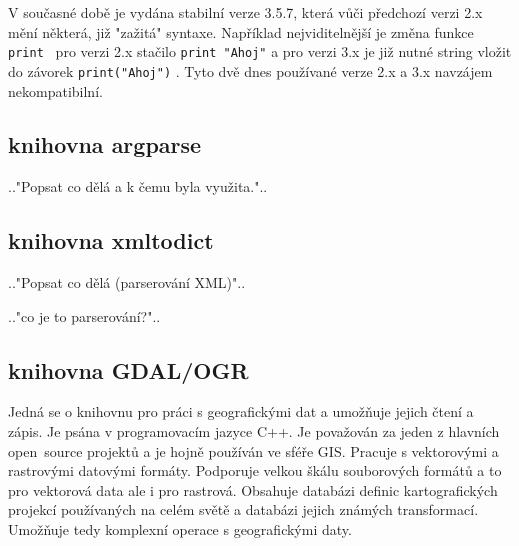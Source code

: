 V současné době je vydána stabilní verze 3.5.7, která vůči předchozí verzi 2.x
mění některá, již "zažitá" syntaxe. Například nejviditelnější je změna funkce 
{\tt print } pro verzi 2.x stačilo  {\tt print "Ahoj"}  a pro verzi 3.x je již
nutné string vložit do závorek  {\tt print("Ahoj")}  . Tyto dvě dnes používané 
verze 2.x a 3.x navzájem nekompatibilní.
\cite{python} 
\cite{wikiPython} 
  
  
\subsection{knihovna argparse}
\label{argparse} 
.."Popsat co dělá a k čemu byla využita."..

\subsection{knihovna xmltodict}
\label{xmltodict} 
.."Popsat co dělá (parserování XML)"..

.."co je to parserování?"..

\subsection{knihovna GDAL/OGR}
\label{GDAL/OGR}
Jedná se o knihovnu pro práci s geografickými dat a umožňuje jejich čtení a zápis.
 Je psána v programovacím jazyce C++. Je považován za jeden z hlavních 
 open~source projektů a je hojně používán ve sféře GIS. Pracuje s vektorovými a 
 rastrovými datovými formáty. Podporuje velkou škálu souborových formátů a to 
 pro vektorová data ale i pro rastrová. Obsahuje databázi definic kartografických
 projekcí používaných na celém světě a databázi jejich známých transformací. 
 Umožňuje tedy komplexní operace s geografickými daty. \cite{GDAL}


